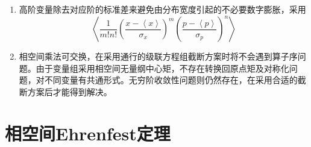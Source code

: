 \documentclass[12pt,a4paper,openany,twoside]{book}
\numberwithin{equation}{section}
\newcommand{\mean}[1]{\left\langle #1 \right\rangle}
\begin{document}
\begin{enumerate}
        \item 高阶变量除去对应阶的标准差来避免由分布宽度引起的不必要数字膨胀，采用
          \begin{equation}
            \mean{\frac{1}{m!n!}\left(\frac{x-\mean{x}}{\sigma_x}\right)^m\left(\frac{p-\mean{p}}{\sigma_p}\right)^n}
          \end{equation}

        \item 相空间乘法可交换，在采用通行的级联方程组截断方案时将不会遇到算子序问题。由于变量组采用相空间无量纲中心矩，不存在转换回原点矩及对称化问题，对不同变量有共通形式。无穷阶收敛性问题则仍然存在，在采用合适的截断方案后才能得到解决。  
      \end{enumerate}

      \section{相空间Ehrenfest定理}
\end{document}
